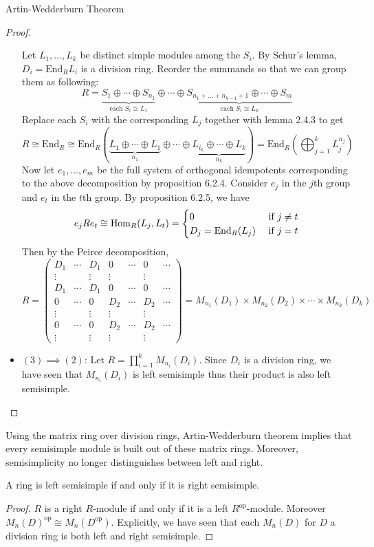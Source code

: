 \documentclass[a4paper]{article}
\begin{document}
\begin{thm}{Artin-Wedderburn Theorem}{}
\begin{proof}
\begin{itemize}
Let $L_1,\dots,L_k$ be distinct simple modules among the $S_i$. By Schur's lemma, $D_i=\text{End}_RL_i$ is a division ring. Reorder the summands so that we can group them as following: $$R=\underbrace{S_1\oplus\cdots\oplus S_{n_1}}_{\text{each }S_i\cong L_1}\oplus\cdots\oplus\underbrace{S_{n_1+\dots+n_{k-1}+1}\oplus\cdots\oplus S_m}_{\text{each }S_i\cong L_k}$$ Replace each $S_i$ with the corresponding $L_j$ together with lemma 2.4.3 to get $$R\cong\text{End}_R\cong\text{End}_R\left(\underbrace{L_1\oplus\cdots\oplus L_1}_{n_1}\oplus\cdots\oplus\underbrace{L_{i_k}\oplus\cdots\oplus L_k}_{n_k}\right)=\text{End}_R\left(\bigoplus_{j=1}^kL_j^{n_j}\right)$$ Now let $e_1,\dots,e_m$ be the full system of orthogonal idempotents corresponding to the above decomposition by proposition 6.2.4. Consider $e_j$ in the $j$th group and $e_t$ in the $t$th group. By proposition 6.2.5, we have $$e_jRe_t\cong\operatorname{Hom}_R(L_j,L_t)=\begin{cases}
0 & \text{ if } j\neq t\\
D_j=\text{End}_R(L_j) & \text{ if }j=t
\end{cases}$$ Then by the Peirce decomposition, $$R=\begin{pmatrix}
D_1 & \cdots & D_1 & 0 & \cdots & 0 & \cdots\\
\vdots & & \vdots & \vdots & & \vdots & \\
D_1 & \cdots & D_1 & 0 & \cdots & 0 & \cdots\\
0 & \cdots & 0 & D_2 & \cdots & D_2 & \cdots\\
\vdots & & \vdots & \vdots & & \vdots & \\
0 & \cdots & 0 & D_2 & \cdots & D_2 & \cdots\\
\vdots & & \vdots & \vdots & & \vdots & 
\end{pmatrix}=M_{n_1}(D_1)\times M_{n_2}(D_2)\times\cdots\times M_{n_k}(D_k)$$
\item $(3)\implies(2)$: Let $R=\prod_{i=1}^kM_{n_i}(D_i)$. Since $D_i$ is a division ring, we have seen that $M_{n_i}(D_i)$ is left semisimple thus their product is also left semisimple. 
\end{itemize}
\end{proof}
\end{thm}

Using the matrix ring over division rings, Artin-Wedderburn theorem implies that every semisimple module is built out of these matrix rings. Moreover, semisimplicity no longer distinguishes between left and right. 

\begin{crl}{}{} A ring is left semisimple if and only if it is right semisimple. \tcbline
\begin{proof}
$R$ is a right $R$-module if and only if it is a left $R^{\text{op}}$-module. Moreover $M_n(D)^\text{op}\cong M_n(D^\text{op})$. Explicitly, we have seen that each $M_n(D)$ for $D$ a division ring is both left and right semisimple. 
\end{proof}
\end{crl}
\end{document}
